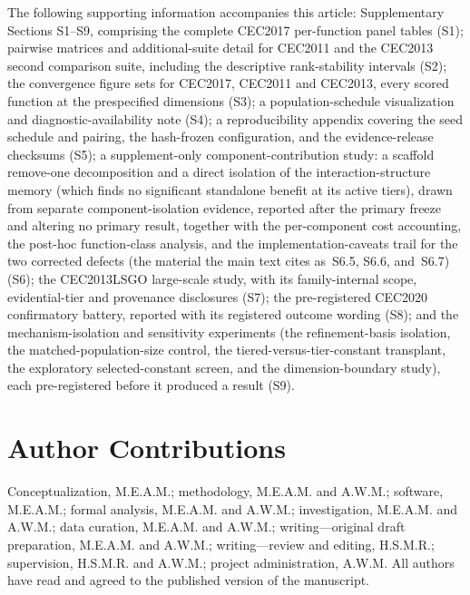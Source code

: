 \documentclass[10pt,a4paper]{article}
\begin{document}
The following supporting information accompanies this
article: Supplementary Sections S1--S9, comprising the complete CEC2017
per-function panel tables (S1); pairwise matrices and additional-suite
detail for CEC2011 and the CEC2013 second comparison suite, including
the descriptive rank-stability intervals (S2); the convergence
figure sets for CEC2017, CEC2011 and CEC2013, every scored function at the
prespecified dimensions (S3); a population-schedule visualization and
diagnostic-availability note (S4); a
reproducibility appendix covering the seed schedule and pairing, the
hash-frozen configuration, and the evidence-release checksums (S5); a
supplement-only component-contribution study: a scaffold
remove-one decomposition and a direct isolation of the interaction-structure
memory (which finds no significant standalone benefit at its active
tiers), drawn from separate component-isolation evidence, reported after the primary
freeze and altering no primary result, together with the per-component cost accounting, the post-hoc function-class analysis, and the implementation-caveats trail for the two corrected defects (the material the main text cites as~S6.5, S6.6, and~S6.7) (S6); the CEC2013LSGO large-scale study, with its family-internal scope, evidential-tier and provenance disclosures (S7); the pre-registered CEC2020 confirmatory battery, reported with its registered outcome wording (S8); and the mechanism-isolation and sensitivity experiments (the refinement-basis isolation, the matched-population-size control, the tiered-versus-tier-constant transplant, the exploratory selected-constant screen, and the dimension-boundary study), each pre-registered before it produced a result (S9).















\section*{Author Contributions}

Conceptualization, M.E.A.M.;
methodology, M.E.A.M. and A.W.M.; software, M.E.A.M.;
formal analysis, M.E.A.M. and A.W.M.; investigation, M.E.A.M. and A.W.M.;
data curation, M.E.A.M. and A.W.M.;
writing---original draft preparation, M.E.A.M. and A.W.M.;
writing---review and editing, H.S.M.R.;
supervision, H.S.M.R. and A.W.M.; project administration, A.W.M.
All authors have read and agreed to the published version of the manuscript.
\end{document}
